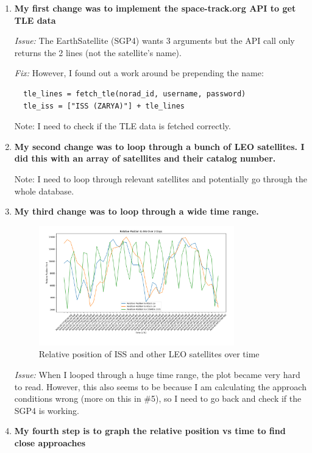 \documentclass[12pt]{report}
\begin{document}
\begin{enumerate}
  \item \textbf{My first change was to implement the space-track.org API to get TLE data}

  \textit{Issue:} The EarthSatellite (SGP4) wants 3 arguments but the API call only returns the 2 lines (not the satellite’s name).

  \textit{Fix:} However, I found out a work around be prepending the name:
  \begin{verbatim}
  tle_lines = fetch_tle(norad_id, username, password)
  tle_iss = ["ISS (ZARYA)"] + tle_lines
  \end{verbatim}
  Note: I need to check if the TLE data is fetched correctly.

  \item \textbf{My second change was to loop through a bunch of LEO satellites. I did this with an array of satellites and their catalog number.}

  Note: I need to loop through relevant satellites and potentially go through the whole database.

  \newpage
  \item \textbf{My third change was to loop through a wide time range.}

  \begin{figure}[H]
    \centering
    \includegraphics[width=0.8\textwidth]{figure_sats_looped.png}
    \caption{Relative position of ISS and other LEO satellites over time}
    \label{fig:orbit}
  \end{figure}


  \textit{Issue:} When I looped through a huge time range, the plot became very hard to read. However, this also seems to be because I am calculating the approach conditions wrong (more on this in \#5), so I need to go back and check if the SGP4 is working.

  \item \textbf{My fourth step is to graph the relative position vs time to find close approaches}


\end{enumerate}
\end{document}
